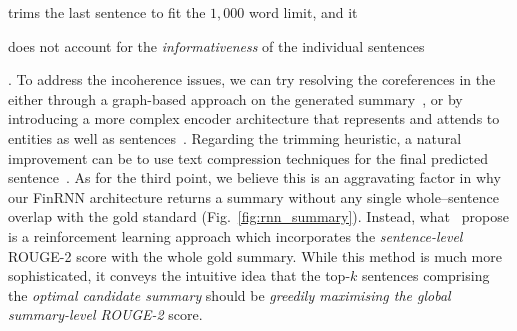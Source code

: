 \begin{itemize}
\begin{enumerate*}[label=(\alph*)]
            \item trims the last sentence to fit the $1,000$ word limit, and it
            \item does not account for the \emph{informativeness} of the individual sentences
        \end{enumerate*}.
        To address the incoherence issues, we can try resolving the coreferences in the either through a
        graph-based approach on the generated summary~\cite{sonawane2016coreference}, or by introducing a more complex
        encoder architecture that represents and attends to entities as well as sentences~\cite{Huang2021ExtractiveSC}.
        Regarding the trimming heuristic, a natural improvement can be to use text compression techniques for the final predicted sentence~\cite{ghalandari2022efficient, KNIGHT200291}.
        As for the third point, we believe this is an aggravating factor in why our FinRNN architecture returns a summary
        without any single whole--sentence overlap with the gold standard (Fig.~\ref{fig:rnn_summary}).
        Instead, what~\cite{zmandar-etal-2021-joint} propose is a reinforcement learning approach which incorporates
        the \emph{sentence-level} ROUGE-2 score with the whole gold summary.
        While this method is much more sophisticated, it conveys the intuitive idea that the top-$k$ sentences comprising the
        \emph{optimal candidate summary} should be \emph{greedily maximising the global summary-level ROUGE-2} score.
\end{itemize}


